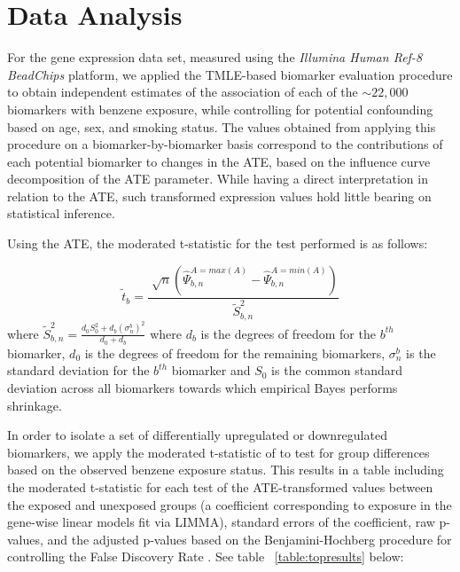 \chapter{Data Analysis}

For the gene expression data set, measured using the \textit{Illumina Human
Ref-8 BeadChips} platform, we applied the TMLE-based biomarker evaluation
procedure to obtain independent estimates of the association of each of the
$\sim 22,000$ biomarkers with benzene exposure, while controlling for potential
confounding based on age, sex, and smoking status. The values obtained from
applying this procedure on a biomarker-by-biomarker basis correspond to the
contributions of each potential biomarker to changes in the ATE, based on the
influence curve decomposition of the ATE parameter. While having a direct
interpretation in relation to the ATE, such transformed expression values hold
little bearing on statistical inference.

Using the ATE, the moderated t-statistic for the test performed is as follows:

$$\tilde{t}_b=\frac{\sqrt[]{n} (\hat{\Psi}_{b,n}^{A = max(A)}-
\hat{\Psi}_{b,n}^{A = min(A)})}{\tilde{S}_{b,n}^2}$$ where
$\tilde{S}_{b,n}^2=\frac{d_0S_0^2+d_b (\sigma^b_n)^2}{d_0+d_b}$ where $d_b$ is
the degrees of freedom for the $b^{th}$ biomarker, $d_0$ is the degrees of
freedom for the remaining biomarkers, $\sigma^b_n$ is the standard deviation for
the $b^{th}$ biomarker and $S_0$ is the common standard deviation across all
biomarkers towards which empirical Bayes performs shrinkage.

In order to isolate a set of differentially upregulated or downregulated
biomarkers, we apply the moderated t-statistic of \cite{smyth2004linear} to
test for group differences based on the observed benzene exposure status. This
results in a table including the moderated t-statistic for each test of the
ATE-transformed values between the exposed and unexposed groups (a coefficient
corresponding to exposure in the gene-wise linear models fit via LIMMA),
standard errors of the coefficient, raw p-values, and the adjusted p-values
based on the Benjamini-Hochberg procedure for controlling the False Discovery
Rate \cite{benjamini1995controlling}. See table ~\ref{table:topresults} below:

